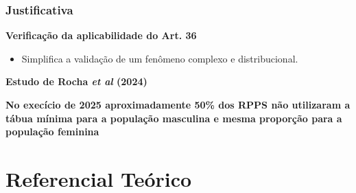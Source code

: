 \documentclass[11pt]{beamer}
\begin{document}
    \begin{frame}

        \frametitle{Justificativa}


            \textbf{Verificação da aplicabilidade do Art. 36}
                \begin{itemize}
                    \medskip
                    \item Simplifica a validação de um fenômeno complexo e distribucional.
                \end{itemize}
            
            \bigskip

            \textbf{Estudo de Rocha \textit{et al} (2024)}
            
            \bigskip

            \textbf{No execício de 2025 aproximadamente 50\% dos RPPS não utilizaram a tábua mínima para a população masculina e mesma proporção para a população feminina}

    \end{frame}

\section{Referencial Teórico}
\end{document}
